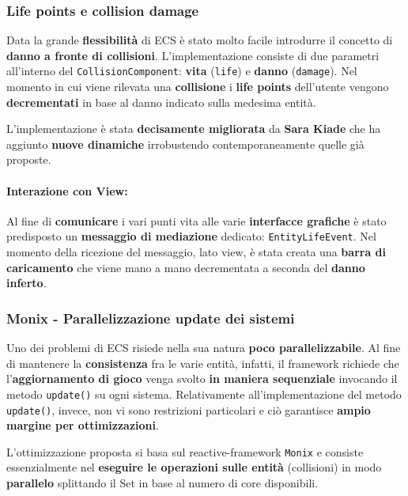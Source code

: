 \subsubsection{Life points e collision damage}
\label{subsubsec:damage}
Data la grande \textbf{flessibilità} di ECS è stato molto facile introdurre il concetto di \textbf{danno a fronte di collisioni}. L'implementazione consiste di due parametri all'interno del \texttt{CollisionComponent}: \textbf{vita} (\texttt{life}) e \textbf{danno} (\texttt{damage}). Nel momento in cui viene rilevata una \textbf{collisione} i \textbf{life points} dell'utente vengono \textbf{decrementati} in base al danno indicato sulla medesima entità.

L'implementazione è stata \textbf{decisamente migliorata} da \textbf{Sara Kiade} che ha aggiunto \textbf{nuove dinamiche} irrobustendo contemporaneamente quelle già proposte.

\paragraph{Interazione con View:}
Al fine di \textbf{comunicare} i vari punti vita alle varie \textbf{interfacce grafiche} è stato predisposto un \textbf{messaggio di mediazione} dedicato: \texttt{EntityLifeEvent}. Nel momento della ricezione del messaggio, lato view, è stata creata una \textbf{barra di caricamento} che viene mano a mano decrementata a seconda del \textbf{danno inferto}.

\subsubsection{Monix - Parallelizzazione update dei sistemi}
\label{subsubsec:monix_sys}
Uno dei problemi di ECS risiede nella sua natura \textbf{poco parallelizzabile}. Al fine di mantenere la \textbf{consistenza} fra le varie entità, infatti, il framework richiede che l'\textbf{aggiornamento di gioco} venga svolto \textbf{in maniera sequenziale} invocando il metodo \texttt{update()} su ogni sistema. Relativamente all'implementazione del metodo \texttt{update()}, invece, non vi sono restrizioni particolari e ciò garantisce \textbf{ampio margine per ottimizzazioni}.

L'ottimizzazione proposta si basa sul reactive-framework \texttt{Monix} e consiste essenzialmente nel \textbf{eseguire le operazioni sulle entità} (collisioni) in modo \textbf{parallelo} splittando il Set in base al numero di core disponibili.

